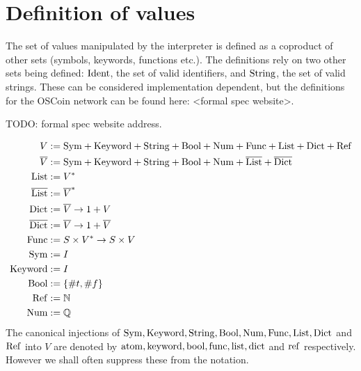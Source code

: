 \section{Definition of \rad values}
\label{value-definition}

The set of values manipulated by the \rad interpreter is defined as a coproduct
of other sets (symbols, keywords, functions etc.). The definitions rely on two
other sets being defined: $\mathrm{Ident}$, the set of valid identifiers, and $\mathrm{String}$,
the set of valid strings. These can be considered implementation dependent, but
the definitions for the OSCoin network can be found here: <formal spec website>.

TODO: formal spec website address.

\begin{align*}
  V &:= \mathrm{Sym} + \mathrm{Keyword} + \mathrm{String} + \mathrm{Bool} + \mathrm{Num} + \mathrm{Func} + \mathrm{List} + \mathrm{Dict} + \mathrm{Ref}\\
  \overline{V} &:= \mathrm{Sym} + \mathrm{Keyword} + \mathrm{String} + \mathrm{Bool} + \mathrm{Num} + \overline{\mathrm{List}} + \overline{\mathrm{Dict}}\\
  \mathrm{List} &:= V^*\\
  \overline{\mathrm{List}} &:= \overline{V}^*\\
  \mathrm{Dict} &:= \overline{V} \to 1 + V\\
  \overline{\mathrm{Dict}} &:= \overline{V} \to 1 + \overline{V}\\
  \mathrm{Func} &:= S \times V^* \to S \times V\\
  \mathrm{Sym} &:= I\\
  \mathrm{Keyword} &:= I\\
  \mathrm{Bool} &:= \{\#t, \#f\}\\
  \mathrm{Ref} &:= \mathbb{N}\\
  \mathrm{Num} &:= \mathbb{Q}
\end{align*}
The canonical injections of $\mathrm{Sym}, \mathrm{Keyword}, \mathrm{String}, \mathrm{Bool}, \mathrm{Num}, \mathrm{Func}, \mathrm{List},
\mathrm{Dict}$ and $\mathrm{Ref}$ into $V$ are denoted by $\mathrm{atom}, \mathrm{keyword}, \mathrm{bool}, \mathrm{func},
\mathrm{list}, \mathrm{dict}$ and $\mathrm{ref}$ respectively. However we shall often suppress these
from the notation.